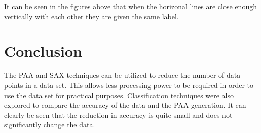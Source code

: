 \documentclass{article}
\begin{document}
It can be seen in the figures above that when the horizonal lines are close 
enough vertically with each other they are given the same label.

\section{Conclusion}
The PAA and SAX techniques can be utilized to reduce the number of data points 
in a data set.  This allows less processing power to be required in order to use
the data set for practical purposes.
\newline
\noindent
Classification techniques were also explored to compare the accuracy of the data
and the PAA generation.  It can clearly be seen that the reduction in accuracy 
is quite small and does not significantly change the data.
\end{document}
